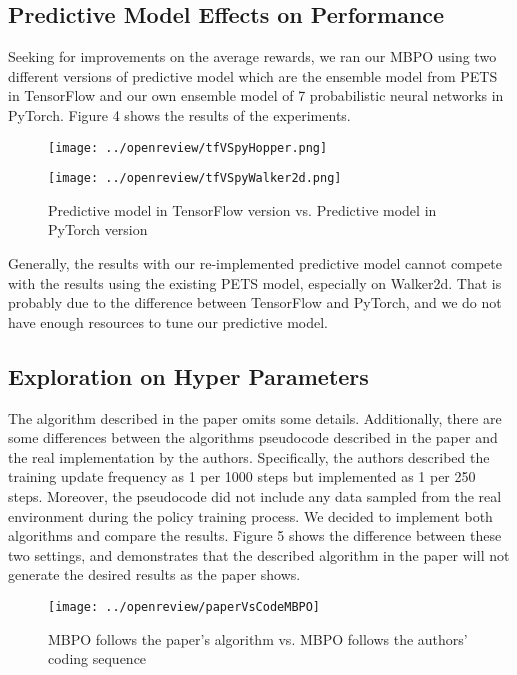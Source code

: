 \subsection{Predictive Model Effects on Performance}

Seeking for improvements on the average rewards, we ran our MBPO using two different versions of predictive model which are the ensemble model from PETS in TensorFlow and our own ensemble model of 7 probabilistic neural networks in PyTorch. Figure 4 shows the results of the experiments.

\begin{figure}[h]
\centering
\begin{minipage}[t]{0.48\textwidth}
\centering
\texttt{[image: ../openreview/tfVSpyHopper.png]}
\end{minipage}
\begin{minipage}[t]{0.48\textwidth}
\centering
\texttt{[image: ../openreview/tfVSpyWalker2d.png]}
\end{minipage}
\caption{Predictive model in TensorFlow version vs. Predictive model in PyTorch version}
\end{figure}

Generally, the results with our re-implemented predictive model cannot compete with the results using the existing PETS model, especially on Walker2d. That is probably due to the difference between TensorFlow and PyTorch, and we do not have enough resources to tune our predictive model.

\subsection{Exploration on Hyper Parameters}

The algorithm described in the paper omits some details. Additionally, there are some differences between the algorithms pseudocode described in the paper and the real implementation by the authors. Specifically, the authors described the training update frequency as 1 per 1000 steps but implemented as 1 per 250 steps. Moreover, the pseudocode did not include any data sampled from the real environment during the policy training process. We decided to implement both algorithms and compare the results. Figure 5 shows the difference between these two settings, and demonstrates that the described algorithm in the paper will not generate the desired results as the paper shows.

\begin{figure}[h]
  \centering
  \texttt{[image: ../openreview/paperVsCodeMBPO]}
  \caption{MBPO follows the paper's algorithm vs. MBPO follows the authors' coding sequence}
\end{figure}

